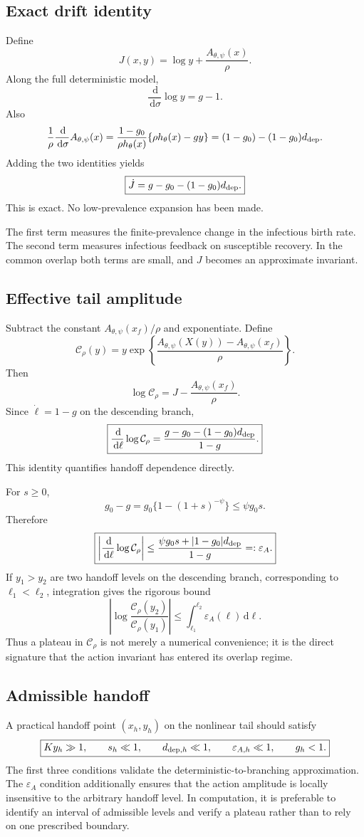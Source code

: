 \documentclass[11pt]{article}
\newcommand{\hth}{h_\theta}
\newcommand{\Apsi}{A_{\theta,\psi}}
\newcommand{\xf}{x_f}
\newcommand{\dd}{\,\mathrm{d}}
\newcommand{\CalC}{\mathcal C_\rho}
\newcommand{\gh}{g_0}
\newcommand{\epsA}{\varepsilon_A}
\begin{document}
\subsection{Exact drift identity}
Define
\[
J(x,y)
=\log y+\frac{\Apsi(x)}{\rho}.
\]
Along the full deterministic model,
\[
\frac{\dd}{\dd\sigma}\log y=g-1.
\]
Also
\[
\frac1\rho\frac{\dd}{\dd\sigma}\Apsi(x)
=\frac{1-\gh}{\rho\hth(x)}\{\rho\hth(x)-gy\}
=(1-\gh)-(1-\gh)d_{\rm dep}.
\]
Adding the two identities yields
\[
\boxed{
\dot J
=g-\gh-(1-\gh)d_{\rm dep}.
}
\]
This is exact. No low-prevalence expansion has been made.

The first term measures the finite-prevalence change in the infectious birth rate. The second term measures infectious feedback on susceptible recovery. In the common overlap both terms are small, and $J$ becomes an approximate invariant.

\subsection{Effective tail amplitude}
Subtract the constant $\Apsi(\xf)/\rho$ and exponentiate. Define
\[
\boxed{
\CalC(y)
=y\exp\left\{\frac{\Apsi(X(y))-\Apsi(\xf)}{\rho}\right\}.
}
\]
Then
\[
\log\CalC
=J-\frac{\Apsi(\xf)}\rho.
\]
Since $\dot\ell=1-g$ on the descending branch,
\[
\boxed{
\frac{\dd}{\dd\ell}\log\CalC
=\frac{g-\gh-(1-\gh)d_{\rm dep}}{1-g}.
}
\]
This identity quantifies handoff dependence directly.

For $s\geq0$,
\[
\gh-g
=\gh\{1-(1+s)^{-\psi}\}
\leq\psi\gh s.
\]
Therefore
\[
\boxed{
\left|
\frac{\dd}{\dd\ell}\log\CalC
\right|
\leq
\frac{\psi\gh s+|1-\gh|d_{\rm dep}}{1-g}
=: \epsA.
}
\]
If $y_1>y_2$ are two handoff levels on the descending branch, corresponding to $\ell_1<\ell_2$, integration gives the rigorous bound
\[
\boxed{
\left|
\log\frac{\CalC(y_2)}{\CalC(y_1)}
\right|
\leq
\int_{\ell_1}^{\ell_2}\epsA(\ell)\dd\ell.
}
\]
Thus a plateau in $\CalC$ is not merely a numerical convenience; it is the direct signature that the action invariant has entered its overlap regime.

\subsection{Admissible handoff}
A practical handoff point $(x_h,y_h)$ on the nonlinear tail should satisfy
\[
\boxed{
Ky_h\gg1,
\qquad
s_h\ll1,
\qquad
d_{{\rm dep},h}\ll1,
\qquad
\varepsilon_{A,h}\ll1,
\qquad
g_h<1.
}
\]
The first three conditions validate the deterministic-to-branching approximation. The $\epsA$ condition additionally ensures that the action amplitude is locally insensitive to the arbitrary handoff level. In computation, it is preferable to identify an interval of admissible levels and verify a plateau rather than to rely on one prescribed boundary.
\end{document}
